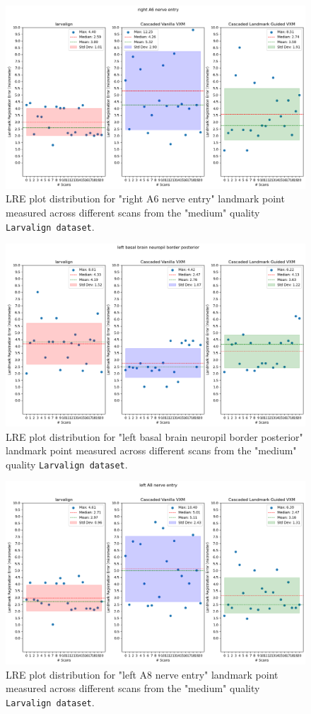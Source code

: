 \documentclass{book}
\begin{document}
	\begin{figure}[h!]
		\centering
		\includegraphics[width=0.75\columnwidth]{resources/chapter5_fresh/output/right A6 nerve entry.png}
		\caption{LRE plot distribution for "right A6 nerve entry" landmark point measured across different scans from the "medium" quality \texttt{Larvalign dataset}.}
		\label{fig:landmark24}
	\end{figure}
	
	\begin{figure}[h!]
		\centering
		\includegraphics[width=0.75\columnwidth]{resources/chapter5_fresh/output/left basal brain neuropil border posterior.png}
		\caption{LRE plot distribution for "left basal brain neuropil border posterior" landmark point measured across different scans from the "medium" quality \texttt{Larvalign dataset}.}
		\label{fig:landmark25}
	\end{figure}
	
	\begin{figure}[h!]
		\centering
		\includegraphics[width=0.75\columnwidth]{resources/chapter5_fresh/output/left A8 nerve entry.png}
		\caption{LRE plot distribution for "left A8 nerve entry" landmark point measured across different scans from the "medium" quality \texttt{Larvalign dataset}.}
		\label{fig:landmark26}
	\end{figure}
	
\end{document}
